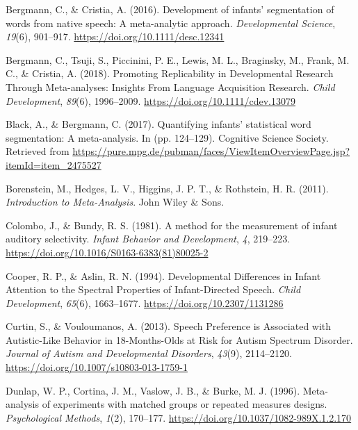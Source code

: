 \documentclass[man,floatsintext]{apa6}
\begin{document}
\begingroup
\setlength{\parindent}{-0.5in}
\setlength{\leftskip}{0.5in}

\hypertarget{refs}{}
\leavevmode\hypertarget{ref-bergmann_development_2016}{}%
Bergmann, C., \& Cristia, A. (2016). Development of infants' segmentation of words from native speech: A meta-analytic approach. \emph{Developmental Science}, \emph{19}(6), 901--917. \url{https://doi.org/10.1111/desc.12341}

\leavevmode\hypertarget{ref-bergmann_promoting_2018}{}%
Bergmann, C., Tsuji, S., Piccinini, P. E., Lewis, M. L., Braginsky, M., Frank, M. C., \& Cristia, A. (2018). Promoting Replicability in Developmental Research Through Meta-analyses: Insights From Language Acquisition Research. \emph{Child Development}, \emph{89}(6), 1996--2009. \url{https://doi.org/10.1111/cdev.13079}

\leavevmode\hypertarget{ref-black_quantifying_2017}{}%
Black, A., \& Bergmann, C. (2017). Quantifying infants' statistical word segmentation: A meta-analysis. In (pp. 124--129). Cognitive Science Society. Retrieved from \url{https://pure.mpg.de/pubman/faces/ViewItemOverviewPage.jsp?itemId=item_2475527}

\leavevmode\hypertarget{ref-borenstein_introduction_2011}{}%
Borenstein, M., Hedges, L. V., Higgins, J. P. T., \& Rothstein, H. R. (2011). \emph{Introduction to Meta-Analysis}. John Wiley \& Sons.

\leavevmode\hypertarget{ref-colombo_method_1981}{}%
Colombo, J., \& Bundy, R. S. (1981). A method for the measurement of infant auditory selectivity. \emph{Infant Behavior and Development}, \emph{4}, 219--223. \url{https://doi.org/10.1016/S0163-6383(81)80025-2}

\leavevmode\hypertarget{ref-cooper_developmental_1994}{}%
Cooper, R. P., \& Aslin, R. N. (1994). Developmental Differences in Infant Attention to the Spectral Properties of Infant-Directed Speech. \emph{Child Development}, \emph{65}(6), 1663--1677. \url{https://doi.org/10.2307/1131286}

\leavevmode\hypertarget{ref-curtin_speech_2013}{}%
Curtin, S., \& Vouloumanos, A. (2013). Speech Preference is Associated with Autistic-Like Behavior in 18-Months-Olds at Risk for Autism Spectrum Disorder. \emph{Journal of Autism and Developmental Disorders}, \emph{43}(9), 2114--2120. \url{https://doi.org/10.1007/s10803-013-1759-1}

\leavevmode\hypertarget{ref-dunlap_meta-analysis_1996}{}%
Dunlap, W. P., Cortina, J. M., Vaslow, J. B., \& Burke, M. J. (1996). Meta-analysis of experiments with matched groups or repeated measures designs. \emph{Psychological Methods}, \emph{1}(2), 170--177. \url{https://doi.org/10.1037/1082-989X.1.2.170}
\end{document}
